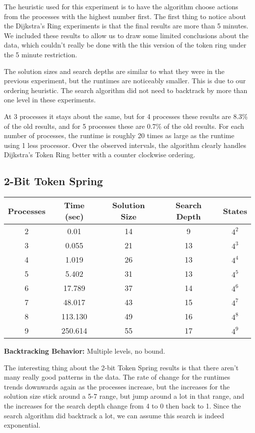 The heuristic used for this experiment is to have the algorithm choose actions from the processes with the highest number first.
The first thing to notice about the Dijkstra's Ring experiments is that the final results are more than 5 minutes.
We included these results to allow us to draw some limited conclusions about the data, which couldn't really be done with the this version of the token ring under the 5 minute restriction.

The solution sizes and search depths are similar to what they were in the previous experiment, but the runtimes are noticeably smaller.
This is due to our ordering heuristic.
The search algorithm did not need to backtrack by more than one level in these experiments.

At 3 processes it stays about the same, but for 4 processes these results are 8.3\% of the old results, and for 5 processes these are 0.7\% of the old results.
For each number of processes, the runtime is roughly 20 times as large as the runtime using 1 less processor.
Over the observed intervals, the algorithm clearly handles Dijkstra's Token Ring better with a counter clockwise ordering.

\subsection{2-Bit Token Spring}
\begin{center}
\begin{tabular}{|c|c|c|c|c|}
\hline
 Processes & Time (sec) & Solution Size & Search Depth & States \\
\hline         
 2 & 0.01 & 14 & 9 & $4^{2}$         \\
 3 & 0.055 & 21 & 13 & $4^{3}$       \\
 4 & 1.019 & 26 & 13 & $4^{4}$      \\
 5 & 5.402 & 31 & 13 & $4^{5}$      \\
 6 & 17.789 & 37 & 14 & $4^{6}$     \\
 7 & 48.017 & 43 & 15 & $4^{7}$     \\
 8 & 113.130 & 49 & 16 & $4^{8}$    \\
 9 & 250.614 & 55 & 17 & $4^{9}$    \\
\hline
\end{tabular}
\end{center}

{\bf Backtracking Behavior:} Multiple levels, no bound.

The interesting thing about the 2-bit Token Spring results is that there aren't many really good patterns in the data.
The rate of change for the runtimes trends downwards again as the processes increase, but the increases for the solution size stick around a 5-7 range, but jump around a lot in that range, and
the increases for the search depth change from 4 to 0 then back to 1.
Since the search algorithm did backtrack a lot, we can assume this search is indeed exponential.

